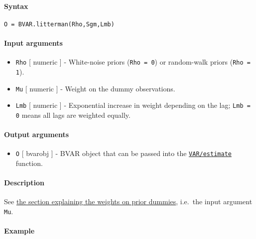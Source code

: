 


	\paragraph{Syntax}\label{syntax}

\begin{verbatim}
O = BVAR.litterman(Rho,Sgm,Lmb)
\end{verbatim}

\paragraph{Input arguments}\label{input-arguments}

\begin{itemize}
\item
  \texttt{Rho} {[} numeric {]} - White-noise priors (\texttt{Rho = 0})
  or random-walk priors (\texttt{Rho = 1}).
\item
  \texttt{Mu} {[} numeric {]} - Weight on the dummy observations.
\item
  \texttt{Lmb} {[} numeric {]} - Exponential increase in weight
  depending on the lag; \texttt{Lmb = 0} means all lags are weighted
  equally.
\end{itemize}

\paragraph{Output arguments}\label{output-arguments}

\begin{itemize}
\itemsep1pt\parskip0pt
\item
  \texttt{O} {[} bvarobj {]} - BVAR object that can be passed into the
  \href{VAR/estimate}{\texttt{VAR/estimate}} function.
\end{itemize}

\paragraph{Description}\label{description}

See \href{BVAR/Contents}{the section explaining the weights on prior
dummies}, i.e.~the input argument \texttt{Mu}.

\paragraph{Example}\label{example}


